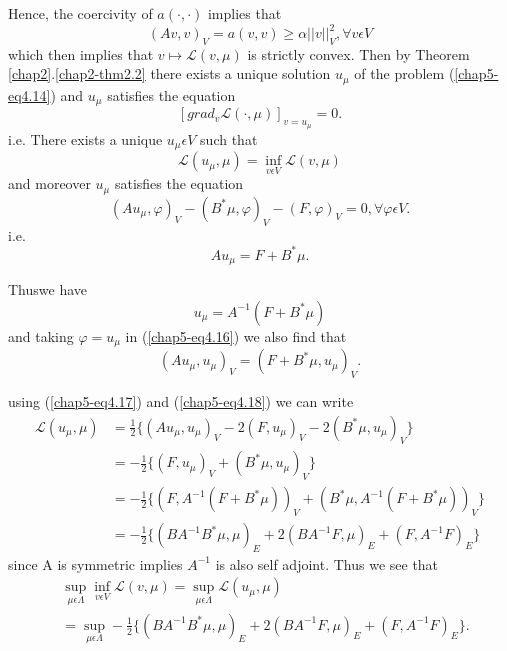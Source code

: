 Hence, the coercivity of $a(\cdot , \cdot)$ implies that
$$
(Av, v)_{V} = a(v, v) \geq \alpha ||v||_{V}^{2}, \forall v \epsilon V
$$
which then implies that $v \mapsto \mathscr{L} (v, \mu)$ is strictly convex. Then by Theorem \ref{chap2}.\ref{chap2-thm2.2} there exists a unique solution $u_{\mu}$ of the problem (\ref{chap5-eq4.14}) and $u_{\mu}$ satisfies the equation
$$
[grad_{v} \mathscr{L} (\cdot , \mu)]_{v=u_{\mu}} = 0.
$$
i.e. There exists a unique $u_{\mu} \epsilon V$ such that
$$
\mathscr{L} (u_{\mu}, \mu) = \inf_{v \epsilon V} \mathscr{L} (v, \mu)
$$
and moreover $u_{\mu}$ satisfies the equation
\begin{equation*}
(Au_{\mu}, \varphi)_{V} - (B^{*} \mu, \varphi)_{V} - (F, \varphi)_{V} = 0, \forall \varphi \epsilon V.\tag{4.16}\label{chap5-eq4.16}
\end{equation*}
i.e. 
\begin{equation*}
Au_{\mu} = F + B^{*} \mu.\tag*{$(4.16)$}\label{chap5-eq4.16'}
\end{equation*}

Thus\pageoriginale we have
\begin{equation*}
u_{\mu} = A^{-1} (F + B^{*} \mu)\tag{4.17}\label{chap5-eq4.17}
\end{equation*}
and taking $\varphi = u_{\mu}$ in (\ref{chap5-eq4.16}) we also find that
\begin{equation*}
(Au_{\mu} , u_{\mu})_{V} = (F + B^{*} \mu, u_{\mu})_{V}.\tag{4.18}\label{chap5-eq4.18}
\end{equation*}

using (\ref{chap5-eq4.17}) and (\ref{chap5-eq4.18}) we can write
\begin{align*}
\mathscr{L} (u_{\mu}, \mu) & = \frac{1}{2} \{(Au_{\mu}, u_{\mu})_{V} - 2(F, u_{\mu})_{V} - 2(B^{*} \mu, u_{\mu})_{V} \}\\
& = -\frac{1}{2} \{(F, u_{\mu})_{V} + (B^{*} \mu, u_{\mu})_{V} \}\\
& = -\frac{1}{2} \{(F, A^{-1} (F + B^{*} \mu))_{V} + (B^{*} \mu, A^{-1} (F + B^{*} \mu))_{V} \}\\
& = -\frac{1}{2} \{(BA^{-1} B^{*} \mu, \mu)_{E} + 2(BA^{-1} F, \mu)_{E} + (F, A^{-1} F)_{E} \}
\end{align*}
since A is symmetric implies $A^{-1}$ is also self adjoint. Thus we see that
\begin{align*}
& \sup_{\mu \epsilon \Lambda} \inf_{v \epsilon V} \mathscr{L} (v, \mu) = \sup_{\mu \epsilon \Lambda} \mathscr{L} (u_{\mu}, \mu)\\
& = \sup_{\mu \epsilon \Lambda} - \frac{1}{2} \{(BA^{-1} B^{*} \mu, \mu)_{E} + 2(BA^{-1} F, \mu)_{E} + (F, A^{-1} F)_{E} \}.
\end{align*}

